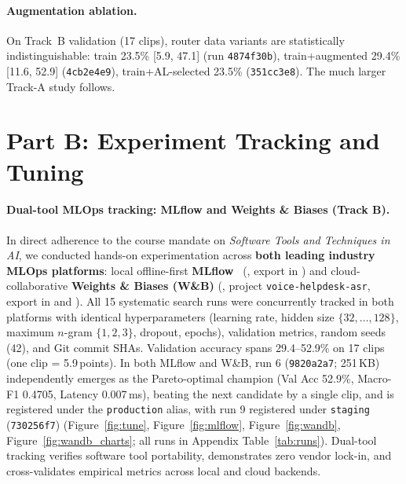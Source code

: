 \documentclass[sigconf,authordraft]{acmart}
\begin{document}
\paragraph{Augmentation ablation.}
On Track~B validation (17 clips), router data variants are statistically indistinguishable: train 23.5\% [5.9, 47.1] (run \texttt{4874f30b}), train+augmented 29.4\% [11.6, 52.9] (\texttt{4cb2e4e9}), train+AL-selected 23.5\% (\texttt{351cc3e8}). The much larger Track-A study follows.

\section{Part B: Experiment Tracking and Tuning}\label{sec:track}
\paragraph{Dual-tool MLOps tracking: MLflow and Weights \& Biases (Track B).}
In direct adherence to the course mandate on \emph{Software Tools and Techniques in AI}, we conducted hands-on experimentation across \textbf{both leading industry MLOps platforms}: local offline-first \textbf{MLflow}~\cite{Zaharia2018} (, export in ) and cloud-collaborative \textbf{Weights \& Biases (W\&B)} (, project \texttt{voice-helpdesk-asr}, export in  and ). All 15 systematic search runs were concurrently tracked in both platforms with identical hyperparameters (learning rate, hidden size $\{32,\dots,128\}$, maximum $n$-gram $\{1,2,3\}$, dropout, epochs), validation metrics, random seeds (42), and Git commit SHAs. Validation accuracy spans 29.4--52.9\% on 17 clips (one clip = 5.9\,points). In both MLflow and W\&B, run 6 (\texttt{9820a2a7}; 251\,KB) independently emerges as the Pareto-optimal champion (Val Acc 52.9\%, Macro-F1 0.4705, Latency 0.007\,ms), beating the next candidate by a single clip, and is registered under the \texttt{production} alias, with run 9 registered under \texttt{staging} (\texttt{730256f7}) (Figure~\ref{fig:tune}, Figure~\ref{fig:mlflow}, Figure~\ref{fig:wandb}, Figure~\ref{fig:wandb_charts}; all runs in Appendix Table~\ref{tab:runs}). Dual-tool tracking verifies software tool portability, demonstrates zero vendor lock-in, and cross-validates empirical metrics across local and cloud backends.
\end{document}
